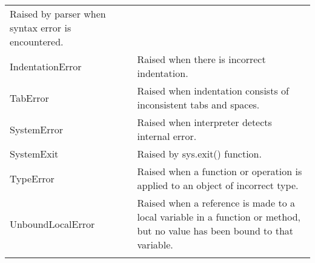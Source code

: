 \documentclass[11pt]{article}
\begin{document}
\begin{longtable}[]{@{}ll@{}}
\begin{minipage}[t]{0.79\columnwidth}
Raised by parser when syntax error is encountered.\strut
\end{minipage}\tabularnewline
\begin{minipage}[t]{0.15\columnwidth}\raggedright\strut
IndentationError\strut
\end{minipage} & \begin{minipage}[t]{0.79\columnwidth}\raggedright\strut
Raised when there is incorrect indentation.\strut
\end{minipage}\tabularnewline
\begin{minipage}[t]{0.15\columnwidth}\raggedright\strut
TabError\strut
\end{minipage} & \begin{minipage}[t]{0.79\columnwidth}\raggedright\strut
Raised when indentation consists of inconsistent tabs and spaces.\strut
\end{minipage}\tabularnewline
\begin{minipage}[t]{0.15\columnwidth}\raggedright\strut
SystemError\strut
\end{minipage} & \begin{minipage}[t]{0.79\columnwidth}\raggedright\strut
Raised when interpreter detects internal error.\strut
\end{minipage}\tabularnewline
\begin{minipage}[t]{0.15\columnwidth}\raggedright\strut
SystemExit\strut
\end{minipage} & \begin{minipage}[t]{0.79\columnwidth}\raggedright\strut
Raised by sys.exit() function.\strut
\end{minipage}\tabularnewline
\begin{minipage}[t]{0.15\columnwidth}\raggedright\strut
TypeError\strut
\end{minipage} & \begin{minipage}[t]{0.79\columnwidth}\raggedright\strut
Raised when a function or operation is applied to an object of incorrect
type.\strut
\end{minipage}\tabularnewline
\begin{minipage}[t]{0.15\columnwidth}\raggedright\strut
UnboundLocalError\strut
\end{minipage} & \begin{minipage}[t]{0.79\columnwidth}\raggedright\strut
Raised when a reference is made to a local variable in a function or
method, but no value has been bound to that variable.\strut
\end{minipage}\tabularnewline
\begin{minipage}[t]{0.15\columnwidth}\raggedright\strut

\end{minipage}
\end{longtable}
\end{document}
